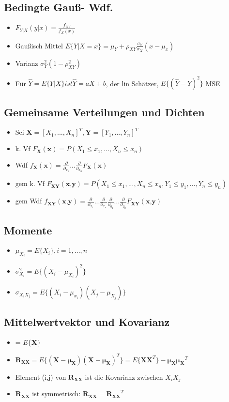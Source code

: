\documentclass{article}
\begin{document}
\subsection{Bedingte Gau\ss - Wdf.}
\begin{itemize}
\item$F_{Y|X}(y|x) = \frac{f_{XY}}{f_X(x)}$
\item Gau\ss isch Mittel  $E\{Y|X=x\} = \mu_Y + \rho_{XY} \frac{\sigma_Y}{\sigma_X}(x-\mu_x)$
\item Varianz $\sigma_Y^2(1-\rho_{XY}^2)$
\item Für $\hat{Y} = E\{Y|X\} ist \hat{Y} = aX+b$, der lin Schätzer, $E\{(\hat{Y}-Y)^2\}$ MSE
\end{itemize}

\subsection{Gemeinsame Verteilungen und Dichten}
\begin{itemize}
\item Sei $\textbf{X} = [X_1, ..., X_n]^T, \textbf{Y} = [Y_1, ..., Y_n]^T$
\item  k. Vf $F_\textbf{X}(\textbf{x}) = P(X_1 \leq x_1, ..., X_n \leq x_n) $
\item  Wdf $f_\textbf{X}(\textbf{x}) = \frac{\partial}{\partial_{x_1}} ... \frac{\partial}{\partial_{x_n}} F_\textbf{X}(\textbf{x})$
\item gem  k. Vf $F_\textbf{XY}(\textbf{x,y}) = P(X_1 \leq x_1, ..., X_n \leq x_n, Y_1 \leq y_1, ..., Y_n \leq y_n) $
\item gem Wdf $f_\textbf{XY}(\textbf{x,y}) = \frac{\partial}{\partial_{x_1}} ... \frac{\partial}{\partial_{x_n}} \frac{\partial}{\partial_{y_1}} ... \frac{\partial}{\partial_{y_n}}F_\textbf{XY}(\textbf{x,y})$
\end{itemize}

\subsection{Momente}
\begin{itemize}
\item $\mu_{X_i} = E\{X_i\}, i = 1, ...,n$
\item $\sigma_{X_i}^2 = E\{(X_i - \mu_{X_i})^2 \}$
\item $\sigma_{X_i X_j} = E\{ (X_i-\mu_{x_i})(X_j-\mu_{X_j})\}$
\end{itemize}

\subsection{Mittelwertvektor und Kovarianz}
\begin{itemize}
\item  {} = $E \{ \bm{X} \} $
\item $\bm{R_{XX}} = E\{(\bm{X}- \bm{\mu_X})(\bm{X}- \bm{\mu_X})^T  \} = E\{\bm{XX}^T \}-\bm{\mu_X\mu_X}^T$
\item Element (i,j) von $\bm{R_{XX}}$ ist die Kovarianz zwischen $X_i X_j$
\item $\bm{R_{XX}}$ ist symmetrisch: $\bm{R_{XX}} = \bm{R_{XX}}^T$
\end{itemize}
\end{document}
